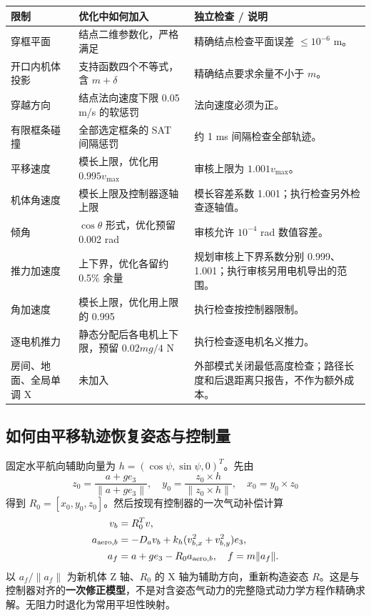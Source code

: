 \documentclass[UTF8,fontset=fandol,a4paper,10pt]{ctexart}
\begin{document}
\begin{longtable}{@{}p{32mm}p{53mm}p{73mm}@{}}
\toprule 限制 & 优化中如何加入 & 独立检查 / 说明\\\midrule\endhead
穿框平面 & 结点二维参数化，严格满足 & 精确结点检查平面误差 $\le10^{-6}$ m。\\
开口内机体投影 & 支持函数四个不等式，含 $m+\delta$ & 精确结点要求余量不小于 $m$。\\
穿越方向 & 结点法向速度下限 0.05 m/s 的软惩罚 & 法向速度必须为正。\\
有限框条碰撞 & 全部选定框条的 SAT 间隔惩罚 & 约 1 ms 间隔检查全部轨迹。\\
平移速度 & 模长上限，优化用 $0.995v_{\max}$ & 审核上限为 $1.001v_{\max}$。\\
机体角速度 & 模长上限及控制器逐轴上限 & 模长容差系数 1.001；执行检查另外检查逐轴值。\\
倾角 & $\cos\theta$ 形式，优化预留 0.002 rad & 审核允许 $10^{-4}$ rad 数值容差。\\
推力加速度 & 上下界，优化各留约 0.5\% 余量 & 规划审核上下界系数分别 0.999、1.001；执行审核另用电机导出的范围。\\
角加速度 & 模长上限，优化用上限的 0.995 & 执行检查按控制器限制。\\
逐电机推力 & 静态分配后各电机上下限，预留 $0.02mg/4$ N & 执行检查逐电机名义推力。\\
房间、地面、全局单调 X & 未加入 & 外部模式关闭最低高度检查；路径长度和后退距离只报告，不作为额外成本。\\\bottomrule
\end{longtable}

\subsection{如何由平移轨迹恢复姿态与控制量}
固定水平航向辅助向量为 $h=(\cos\psi,\sin\psi,0)^T$。先由
\[
 z_0=\frac{a+ge_3}{\|a+ge_3\|},\quad
 y_0=\frac{z_0\times h}{\|z_0\times h\|},\quad x_0=y_0\times z_0
\]
得到 $R_0=[x_0,y_0,z_0]$。然后按现有控制器的一次气动补偿计算
\begin{align}
 v_b&=R_0^Tv,\\
 a_{{\rm aero},b}&=-D_a v_b+k_h(v_{b,x}^2+v_{b,y}^2)e_3,\\
 a_f&=a+ge_3-R_0a_{{\rm aero},b},\quad f=m\|a_f\|.
\end{align}
以 $a_f/\|a_f\|$ 为新机体 Z 轴、$R_0$ 的 X 轴为辅助方向，重新构造姿态 $R$。这是与控制器对齐的\textbf{一次修正模型}，不是对含姿态气动力的完整隐式动力学方程作精确求解。无阻力时退化为常用平坦性映射。
\end{document}
